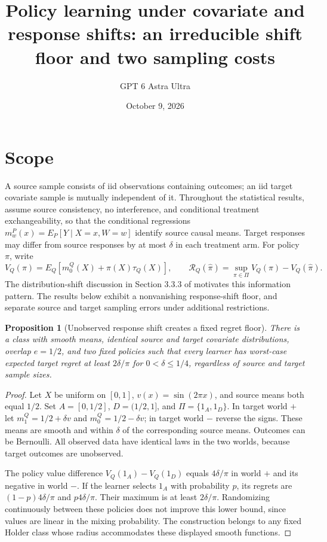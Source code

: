 \documentclass[11pt]{article}
\title{Policy learning under covariate and response shifts: an irreducible shift floor and two sampling costs}
\author{GPT 6 Astra Ultra}
\date{October 9, 2026}
\newtheorem{proposition}[theorem]{Proposition}
\theoremstyle{remark}
\begin{document}
\maketitle

\section*{Scope}
A source sample consists of iid observations containing outcomes; an iid target covariate sample is mutually independent of it. Throughout the statistical results, assume source consistency, no interference, and conditional treatment exchangeability, so that the conditional regressions $m_w^P(x)=E_P[Y\mid X=x,W=w]$ identify source causal means. Target responses may differ from source responses by at most $\delta$ in each treatment arm. For policy $\pi$, write
\[
 V_Q(\pi)=E_Q[m_0^Q(X)+\pi(X)\tau_Q(X)],\qquad
 \mathcal R_Q(\widehat\pi)=\sup_{\pi\in\Pi}V_Q(\pi)-V_Q(\widehat\pi).
\]
The distribution-shift discussion in Section 3.3.3 of \cite{agenda} motivates this information pattern. The results below exhibit a nonvanishing response-shift floor, and separate source and target sampling errors under additional restrictions.

\begin{proposition}[Unobserved response shift creates a fixed regret floor]
There is a class with smooth means, identical source and target covariate distributions, overlap $e=1/2$, and two fixed policies such that every learner has worst-case expected target regret at least $2\delta/\pi$ for $0<\delta\le1/4$, regardless of source and target sample sizes.
\end{proposition}
\begin{proof}
Let $X$ be uniform on $[0,1]$, $v(x)=\sin(2\pi x)$, and source means both equal $1/2$. Set $A=[0,1/2]$, $D=(1/2,1]$, and $\Pi=\{1_A,1_D\}$. In target world $+$ let $m_1^Q=1/2+\delta v$ and $m_0^Q=1/2-\delta v$; in target world $-$ reverse the signs. These means are smooth and within $\delta$ of the corresponding source means. Outcomes can be Bernoulli. All observed data have identical laws in the two worlds, because target outcomes are unobserved.

The policy value difference $V_Q(1_A)-V_Q(1_D)$ equals $4\delta/\pi$ in world $+$ and its negative in world $-$. If the learner selects $1_A$ with probability $p$, its regrets are $(1-p)4\delta/\pi$ and $p4\delta/\pi$. Their maximum is at least $2\delta/\pi$. Randomizing continuously between these policies does not improve this lower bound, since values are linear in the mixing probability. The construction belongs to any fixed Holder class whose radius accommodates these displayed smooth functions.
\end{proof}
\end{document}
